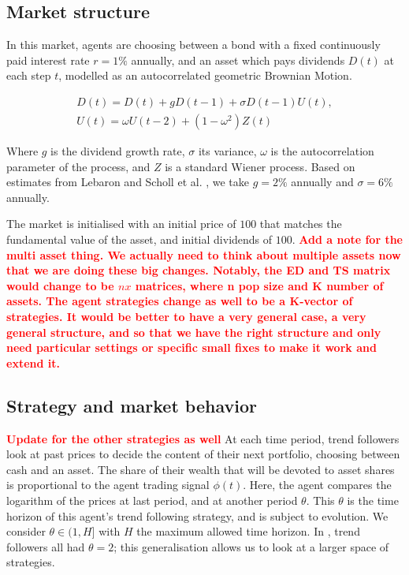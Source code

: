 \documentclass{article}
\newcommand\boldred[1]{\textcolor{red}{\textbf{#1}}}
\begin{document}
\subsection{Market structure}

In this market, agents are choosing between a bond with a fixed continuously paid interest rate $r = 1\%$ annually, and an asset which pays dividends $D(t)$ at each step $t$, modelled as an autocorrelated geometric Brownian Motion.

\begin{equation}
    \label{dividend_equation}
    \begin{array}{l}
{D}(t)={D}(t)+g {D}(t-1)+\sigma {D}(t-1) {U}(t), \\
{U}(t)=\omega U(t-2)+\left(1-\omega^{2}\right){Z}(t)
\end{array}
\end{equation}

Where $g$ is the dividend growth rate, $\sigma$ its variance, $\omega$ is the autocorrelation parameter of the process, and $Z$ is a standard Wiener process. Based on estimates from Lebaron \cite{lebaron2001empirical} and Scholl et al. \cite{scholl2020market}, we take $g=2\%$ annually and $\sigma = 6\%$ annually. \par
The market is initialised with an initial price of $100$ that matches the fundamental value of the asset, and initial dividends of $100$. 
\boldred{Add a note for the multi asset thing. We actually need to think about multiple assets now that we are doing these big changes. Notably, the ED and TS matrix would change to be $nx$ matrices, where n pop size and K number of assets. The agent strategies change as well to be a K-vector of strategies. It would be better to have a very general case, a very general structure, and so that we have the right structure and only need particular settings or specific small fixes to make it work and extend it.}

\subsection{Strategy and market behavior}
\boldred{Update for the other strategies as well}
At each time period, trend followers look at past prices to decide the content of their next portfolio, choosing between cash and an asset. The share of their wealth that will be devoted to asset shares is proportional to the agent trading signal $\phi(t)$. Here, the agent compares the logarithm of the prices at last period, and at another period $\theta$. This $\theta$ is the time horizon of this agent's trend following strategy, and is subject to evolution. We consider $\theta \in (1, H]$ with $H$ the maximum allowed time horizon. In \cite{scholl2020market}, trend followers all had $\theta = 2$; this generalisation allows us to look at a larger space of strategies.
\end{document}
